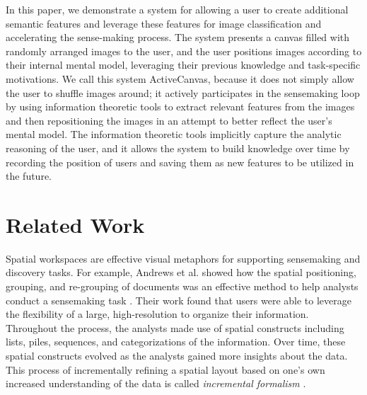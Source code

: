 \documentclass[journal]{vgtc}
\newcommand{\remove}[1]{}
\begin{document}
In this paper, we demonstrate a system for allowing a user to create additional semantic features and leverage these features for image classification and accelerating the sense-making process.  The system presents a canvas filled with randomly arranged images to the user, and the user positions images according to their internal mental model, leveraging their previous knowledge and task-specific motivations. We call this system ActiveCanvas, because it does not simply allow the user to shuffle images around; it actively participates in the sensemaking loop by using information theoretic tools to extract relevant features from the images and then repositioning the images in an attempt to  better reflect the user's mental model. The information theoretic tools implicitly capture the analytic reasoning of the user, and it allows the system to build knowledge over time by recording the position of users and saving them as new features to be utilized in the future.
 






\remove{The contributions of this work include:
\begin{itemize}
\item A visual analytic technique for inferring and creating additional dimensions for datasets pertaining to the domain expertise of the user.
\item A technique for leveraging  knowledge of prior users in the visual analytic process.
\end{itemize}
}


\section{Related Work}

Spatial workspaces are effective visual metaphors for supporting sensemaking and discovery tasks. For example, Andrews et al. showed how the spatial positioning, grouping, and re-grouping of documents was an effective method to help analysts conduct a sensemaking task \cite{andrews_space_2010}. Their work found that users were able to leverage the flexibility of a large, high-resolution to organize their information. Throughout the process, the analysts made use of spatial constructs including lists, piles, sequences, and categorizations of the information. Over time, these spatial constructs evolved as the analysts gained more insights about the data. This process of incrementally refining a spatial layout based on one's own increased understanding of the data is called \textit{incremental formalism} \cite{shipman_formality_1999}. 
\end{document}
